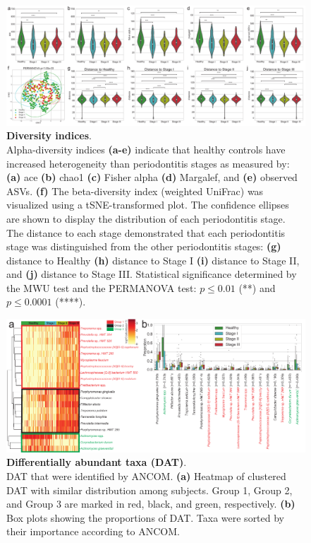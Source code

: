 \documentclass[11pt, a4paper, onecolumn, oneside]{report}
\begin{document}
            \begin{figure}[p]
                \centering
                \includegraphics[width=\linewidth]{Figures/Periodontitis/Figure_1.pdf}
                \caption[Diversity indices]{\textbf{Diversity indices}. \\
                    Alpha-diversity indices \textbf{(a-e)} indicate that healthy controls have increased heterogeneity than periodontitis stages as measured by: \textbf{(a)} ace \textbf{(b)} chao1 \textbf{(c)} Fisher alpha \textbf{(d)} Margalef, and \textbf{(e)} observed ASVs. \textbf{(f)} The beta-diversity index (weighted UniFrac) was visualized using a tSNE-transformed plot. The confidence ellipses are shown to display the distribution of each periodontitis stage. The distance to each stage demonstrated that each periodontitis stage was distinguished from the other periodontitis stages: \textbf{(g)} distance to Healthy \textbf{(h)} distance to Stage I \textbf{(i)} distance to Stage II, and \textbf{(j)} distance to Stage III. Statistical significance determined by the MWU test and the PERMANOVA test: $p \le 0.01$ (**) and $p \le 0.0001$ (****).}
                \label{fig:Periodontitis-diversity}
            \end{figure}
            \clearpage

            \begin{figure}[p]
                \centering
                \includegraphics[width=\linewidth]{Figures/Periodontitis/Figure_2.pdf}
                \caption[Differentially abundant taxa (DAT)]{\textbf{Differentially abundant taxa (DAT)}. \\
                    DAT that were identified by ANCOM. \textbf{(a)} Heatmap of clustered DAT with similar distribution among subjects. Group 1, Group 2, and Group 3 are marked in red, black, and green, respectively. \textbf{(b)} Box plots showing the proportions of DAT. Taxa were sorted by their importance according to ANCOM.}
                \label{fig:Periodontitis-DAT}
            \end{figure}
            \clearpage
\end{document}
